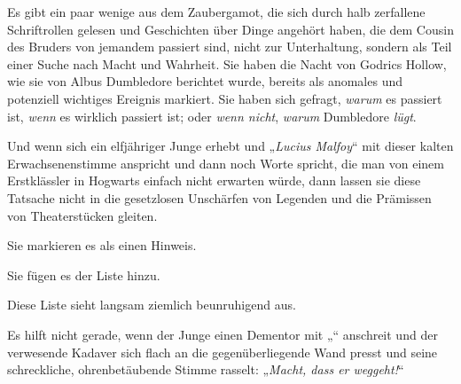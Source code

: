 Es gibt ein paar wenige aus dem Zaubergamot, die sich durch halb zerfallene Schriftrollen gelesen und Geschichten über Dinge angehört haben, die dem Cousin des Bruders von jemandem passiert sind, nicht zur Unterhaltung, sondern als Teil einer Suche nach Macht und Wahrheit. Sie haben die Nacht von Godrics Hollow, wie sie von Albus Dumbledore berichtet wurde, bereits als anomales und potenziell wichtiges Ereignis markiert. Sie haben sich gefragt, \emph{warum} es passiert ist, \emph{wenn} es wirklich passiert ist; oder \emph{wenn nicht}, \emph{warum} Dumbledore \emph{lügt}.

Und wenn sich ein elfjähriger Junge erhebt und
„\emph{Lucius Malfoy}“ mit dieser kalten Erwachsenenstimme anspricht und dann noch Worte spricht, die man von einem Erstklässler in Hogwarts einfach nicht erwarten würde, dann lassen sie diese Tatsache nicht in die gesetzlosen Unschärfen von Legenden und die Prämissen von Theaterstücken gleiten.

Sie markieren es als einen Hinweis.

Sie fügen es der Liste hinzu.

Diese Liste sieht langsam ziemlich beunruhigend aus.

Es hilft nicht gerade, wenn der Junge einen Dementor mit
„“ anschreit und der verwesende Kadaver sich flach an die gegenüberliegende Wand presst und seine schreckliche, ohrenbetäubende Stimme rasselt:
„\emph{Macht, dass er weggeht!}“

